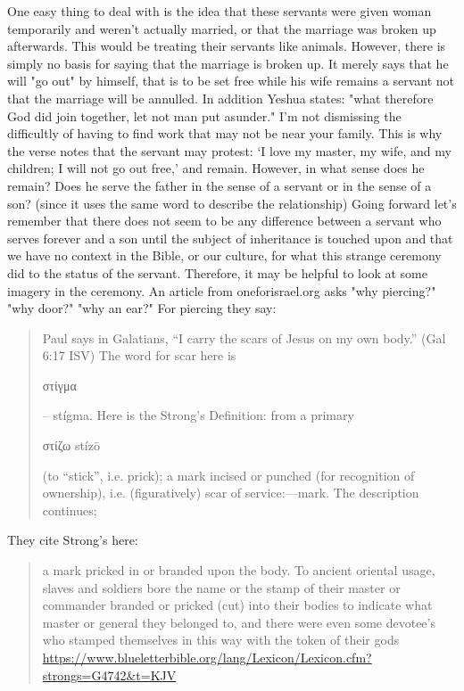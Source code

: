 \documentclass[11pt]{article}
\begin{document}
One easy thing to deal with is the idea that these servants were given woman temporarily and weren't actually married, or that the marriage was broken up afterwards. This would be treating their servants like animals. However, there is simply no basis for saying that the marriage is broken up. It merely says that he will "go out" by himself, that is to be set free while his wife remains a servant not that the marriage will be annulled. In addition Yeshua states: "what therefore God did join together, let not man put asunder." I'm not dismissing the difficultly of having to find work that may not be near your family. This is why the verse notes that the servant may protest: ‘I love my master, my wife, and my children; I will not go out free,’ and remain. However, in what sense does he remain? Does he serve the father in the sense of a servant or in the sense of a son? (since it uses the same word to describe the relationship) Going forward let's remember that there does not seem to be any difference between a servant who serves forever and a son until the subject of inheritance is touched upon and that we have no context in the Bible, or our culture, for what this strange ceremony did to the status of the servant. Therefore, it may be helpful to look at some imagery in the ceremony. An article from oneforisrael.org asks "why piercing?" "why door?" "why an ear?"
For piercing they say:
\begin{quote}
Paul says in Galatians, “I carry the scars of Jesus on my own body.” (Gal 6:17 ISV) The word for scar here is \begin{greek} στίγμα \end{greek} – stígma. Here is the Strong’s Definition: from a primary \begin{greek} στίζω stízō \end{greek} (to “stick”, i.e. prick); a mark incised or punched (for recognition of ownership), i.e. (figuratively) scar of service:—mark. The description continues;\end{quote}

They cite Strong's here:
\begin{quote}
a mark pricked in or branded upon the body. To ancient oriental usage, slaves and soldiers bore the name or the stamp of their master or commander branded or pricked (cut) into their bodies to indicate what master or general they belonged to, and there were even some devotee's who stamped themselves in this way with the token of their gods \url{https://www.blueletterbible.org/lang/Lexicon/Lexicon.cfm?strongs=G4742&t=KJV}
\end{quote}
\end{document}
